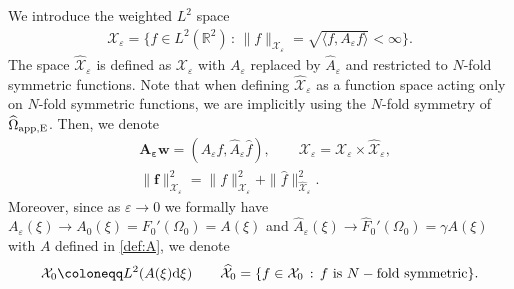 \documentclass[11pt,reqno,a4paper]{amsart}
\def\dd{{\rm d}}
\def\eps{\varepsilon}
\def\RR {\mathbb{R}}
\newcommand{\cX}{\mathcal{X}}
\newcommand{\1}{\mathbbm{1}}
\theoremstyle{definition}
\theoremstyle{definition}
\numberwithin{equation}{section}
\begin{document}
We introduce the weighted $L^2$ space 
\begin{align}
\label{def:Xeps}
    \cX_{\eps}=\big \{f\in L^2(\RR^2)\, :\, \|f\|_{\cX_\eps}=\sqrt{\langle f,A_\eps f\rangle}<\infty\big \}.
\end{align}
The space $\widehat{\cX}_\eps$ is defined as $\cX_{\eps}$ with $A_{\eps}$ replaced by $\widehat{A}_\eps$ and restricted to $N$-fold symmetric functions. Note that when defining $\widehat{\cX}_\eps$ as a function space acting only on $N$-fold symmetric functions, we are implicitly using the $N$-fold symmetry of $\widehat{\Omega}_{\rm app,E}$. Then, we denote 
\begin{align}
  \label{vec6}  &\mathbf{A_\eps w}=(A_{\eps}f,\widehat{A}_\eps \widehat{f}), \qquad \boldsymbol{\cX}_\eps=\cX_\eps\times\widehat{\cX}_\eps,\\
    \label{vec7}&\|{\mathbf f}\|_{\boldsymbol{\cX}_\eps}^2=\|f\|^2_{\cX_\eps}+\|\widehat{f}\|^2_{\widehat{\cX}_\eps}.
\end{align}
Moreover, since as $\eps\to 0$ we formally have $A_{\eps}(\xi)\to A_0(\xi)=F_0'(\Omega_0)=A(\xi)$ and $\widehat{A}_{\eps}(\xi)\to \widehat{F}_0'(\Omega_0)=\gamma A(\xi)$ with $A$ defined in \cref{def:A}, we denote$$\cX_0\coloneqq L^2(A(\xi)\dd \xi)\qquad \widehat{\cX}_0=\{f\in  \cX_0\, :\, f \text{ is }N-\text{fold symmetric}\}.$$
\end{document}
